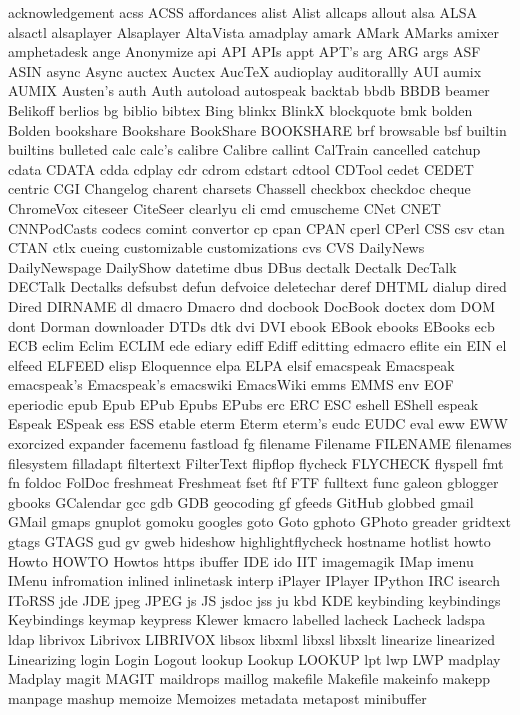 acknowledgement
acss
ACSS
affordances
alist
Alist
allcaps
allout
alsa
ALSA
alsactl
alsaplayer
Alsaplayer
AltaVista
amadplay
amark
AMark
AMarks
amixer
amphetadesk
ange
Anonymize
api
API
APIs
appt
APT's
arg
ARG
args
ASF
ASIN
async
Async
auctex
Auctex
AucTeX
audioplay
auditorallly
AUI
aumix
AUMIX
Austen's
auth
Auth
autoload
autospeak
backtab
bbdb
BBDB
beamer
Belikoff
berlios
bg
biblio
bibtex
Bing
blinkx
BlinkX
blockquote
bmk
bolden
Bolden
bookshare
Bookshare
BookShare
BOOKSHARE
brf
browsable
bsf
builtin
builtins
bulleted
calc
calc's
calibre
Calibre
callint
CalTrain
cancelled
catchup
cdata
CDATA
cdda
cdplay
cdr
cdrom
cdstart
cdtool
CDTool
cedet
CEDET
centric
CGI
Changelog
charent
charsets
Chassell
checkbox
checkdoc
cheque
ChromeVox
citeseer
CiteSeer
clearlyu
cli
cmd
cmuscheme
CNet
CNET
CNNPodCasts
codecs
comint
convertor
cp
cpan
CPAN
cperl
CPerl
CSS
csv
ctan
CTAN
ctlx
cueing
customizable
customizations
cvs
CVS
DailyNews
DailyNewspage
DailyShow
datetime
dbus
DBus
dectalk
Dectalk
DecTalk
DECTalk
Dectalks
defsubst
defun
defvoice
deletechar
deref
DHTML
dialup
dired
Dired
DIRNAME
dl
dmacro
Dmacro
dnd
docbook
DocBook
doctex
dom
DOM
dont
Dorman
downloader
DTDs
dtk
dvi
DVI
ebook
EBook
ebooks
EBooks
ecb
ECB
eclim
Eclim
ECLIM
ede
ediary
ediff
Ediff
editting
edmacro
eflite
ein
EIN
el
elfeed
ELFEED
elisp
Eloquennce
elpa
ELPA
elsif
emacspeak
Emacspeak
emacspeak's
Emacspeak's
emacswiki
EmacsWiki
emms
EMMS
env
EOF
eperiodic
epub
Epub
EPub
Epubs
EPubs
erc
ERC
ESC
eshell
EShell
espeak
Espeak
ESpeak
ess
ESS
etable
eterm
Eterm
eterm's
eudc
EUDC
eval
eww
EWW
exorcized
expander
facemenu
fastload
fg
filename
Filename
FILENAME
filenames
filesystem
filladapt
filtertext
FilterText
flipflop
flycheck
FLYCHECK
flyspell
fmt
fn
foldoc
FolDoc
freshmeat
Freshmeat
fset
ftf
FTF
fulltext
func
galeon
gblogger
gbooks
GCalendar
gcc
gdb
GDB
geocoding
gf
gfeeds
GitHub
globbed
gmail
GMail
gmaps
gnuplot
gomoku
googles
goto
Goto
gphoto
GPhoto
greader
gridtext
gtags
GTAGS
gud
gv
gweb
hideshow
highlightflycheck
hostname
hotlist
howto
Howto
HOWTO
Howtos
https
ibuffer
IDE
ido
IIT
imagemagik
IMap
imenu
IMenu
infromation
inlined
inlinetask
interp
iPlayer
IPlayer
IPython
IRC
isearch
IToRSS
jde
JDE
jpeg
JPEG
js
JS
jsdoc
jss
ju
kbd
KDE
keybinding
keybindings
Keybindings
keymap
keypress
Klewer
kmacro
labelled
lacheck
Lacheck
ladspa
ldap
librivox
Librivox
LIBRIVOX
libsox
libxml
libxsl
libxslt
linearize
linearized
Linearizing
login
Login
Logout
lookup
Lookup
LOOKUP
lpt
lwp
LWP
madplay
Madplay
magit
MAGIT
maildrops
maillog
makefile
Makefile
makeinfo
makepp
manpage
mashup
memoize
Memoizes
metadata
metapost
minibuffer
